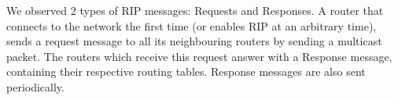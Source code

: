 We observed 2 types of RIP messages: Requests and Responses. A router that connects to the network the first time (or enables RIP at an arbitrary time), sends a request message to all its neighbouring routers by sending a multicast packet. The routers which receive this request answer with a Response message, containing their respective routing tables. Response messages are also sent periodically.